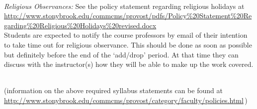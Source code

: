 \documentclass[11pt]{article}
\begin{document}
\ \\[-2mm]
\noindent
{\em Religious Observances: }
%
See the policy statement regarding religious holidays at \\[0.25em]
{\footnotesize \url{http://www.stonybrook.edu/commcms/provost/pdfs/Policy\%20Statement\%20Regarding\%20Religious\%20Holidays\%20revised.docx}}
\\[0.25em]
%
Students are expected to notify the course professors by email of
their intention to take time out for religious observance.  This
should be done as soon as possible but definitely before the end of
the `add/drop' period.  At that time they can discuss with the
instructor(s) how they will be able to make up the work covered.






\ \\[3 mm]
\noindent
(information on the above required syllabus statements can be found at \\
\url{http://www.stonybrook.edu/commcms/provost/category/faculty/policies.html}\,)
\end{document}
